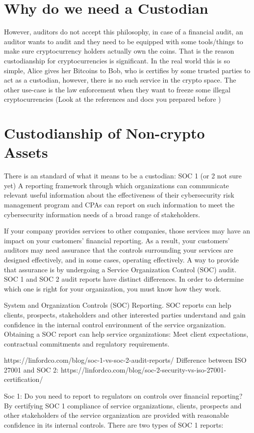 \section{Why do we need a Custodian}
However, auditors do not accept this philosophy, in case of a financial audit, an auditor wants to audit and they need to be equipped with some tools/things to make sure cryptocurrency holders actually own the coins. That is the reason custodianship for cryptocurrencies is significant. In the real world this is so simple, Alice gives her Bitcoins to Bob, who is certifies by some trusted parties to act as a custodian, however, there is no such service in the crypto space. The other use-case is the law enforcement when they want to freeze some illegal cryptocurrencies (Look at the references and docs you prepared before )




\section{Custodianship of Non-crypto Assets}
There is an standard of what it means to be a custodian: SOC 1 (or 2 not sure yet)
A reporting framework through which organizations can communicate relevant useful information about the effectiveness of their cybersecurity risk management program and CPAs can report on such information to meet the cybersecurity information needs of a broad range of stakeholders. \par
If your company provides services to other companies, those services may have an impact on your customers’ financial reporting. As a result, your customers’ auditors may need assurance that the controls surrounding your services are designed effectively, and in some cases, operating effectively. A way to provide that assurance is by undergoing a Service Organization Control (SOC) audit. SOC 1 and SOC 2 audit reports have distinct differences. In order to determine which one is right for your organization, you must know how they work.
\par
System and Organization Controls (SOC) Reporting. SOC reports can help clients, prospects, stakeholders and other interested parties understand and gain confidence in the internal control environment of the service organization. Obtaining a SOC report can help service organizations: Meet client expectations, contractual commitments and regulatory requirements. 
 
 https://linfordco.com/blog/soc-1-vs-soc-2-audit-reports/
Difference between ISO 27001 and SOC 2: https://linfordco.com/blog/soc-2-security-vs-iso-27001-certification/
\par
Soc 1: Do you need to report to regulators on controls over financial reporting? By certifying SOC 1 compliance of service organizations, clients, prospects and other stakeholders of the service organization are provided with reasonable confidence in its internal controls. 
There are two types of SOC 1 reports:


